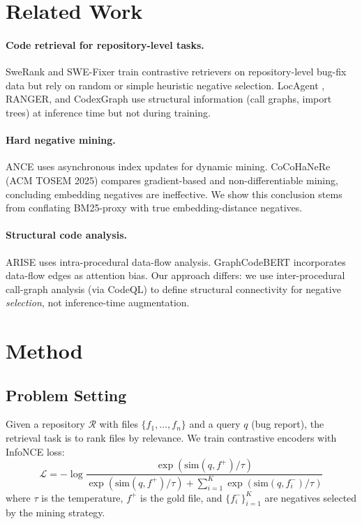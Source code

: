 \documentclass[11pt,a4paper]{article}
\begin{document}
\section{Related Work}

\paragraph{Code retrieval for repository-level tasks.} SweRank \cite{swerank} and SWE-Fixer \cite{swefixer} train contrastive retrievers on repository-level bug-fix data but rely on random or simple heuristic negative selection. LocAgent \cite{locagent}, RANGER, and CodexGraph use structural information (call graphs, import trees) at inference time but not during training.

\paragraph{Hard negative mining.} ANCE \cite{ance} uses asynchronous index updates for dynamic mining. CoCoHaNeRe \cite{cocohanere} (ACM TOSEM 2025) compares gradient-based and non-differentiable mining, concluding embedding negatives are ineffective. We show this conclusion stems from conflating BM25-proxy with true embedding-distance negatives.

\paragraph{Structural code analysis.} ARISE uses intra-procedural data-flow analysis. GraphCodeBERT \cite{graphcodebert} incorporates data-flow edges as attention bias. Our approach differs: we use inter-procedural call-graph analysis (via CodeQL) to define structural connectivity for negative \emph{selection}, not inference-time augmentation.

\section{Method}

\subsection{Problem Setting}

Given a repository $\mathcal{R}$ with files $\{f_1, \ldots, f_n\}$ and a query $q$ (bug report), the retrieval task is to rank files by relevance. We train contrastive encoders with InfoNCE loss:
\begin{equation}
\mathcal{L} = -\log \frac{\exp(\text{sim}(q, f^+)/\tau)}{\exp(\text{sim}(q, f^+)/\tau) + \sum_{i=1}^{K} \exp(\text{sim}(q, f_i^-)/\tau)}
\end{equation}
where $\tau$ is the temperature, $f^+$ is the gold file, and $\{f_i^-\}_{i=1}^K$ are negatives selected by the mining strategy.
\end{document}
